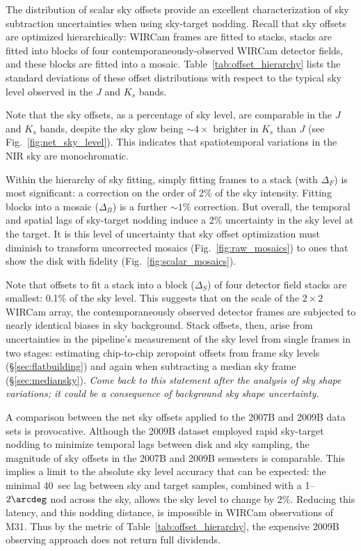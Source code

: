 \documentclass[iop]{emulateapj}
\newcommand{\comment}[1]{\textcolor{OliveGreen}{\textit{#1}}} %
\newcommand{\Fig}[1]{Fig.~\ref{fig:#1}}  %
\newcommand{\Tab}[1]{Table~\ref{tab:#1}}  %
\newcommand{\Sec}[1]{\S\ref{sec:#1}}  %
\begin{document}
The distribution of scalar sky offsets provide an excellent characterization of sky subtraction uncertainties when using sky-target nodding.
Recall that sky offsets are optimized hierarchically: WIRCam frames are fitted to stacks, stacks are fitted into blocks of four contemporaneously-observed WIRCam detector fields, and these blocks are fitted into a mosaic.
\Tab{offset_hierarchy} lists the standard deviations of these offset distributions with respect to the typical sky level observed in the $J$ and $K_s$ bands.


Note that the sky offsets, as a percentage of sky level, are comparable in the $J$ and $K_s$ bands, despite the sky glow being $\sim 4\times$ brighter in $K_s$ than $J$ (see \Fig{net_sky_level}).
This indicates that spatiotemporal variations in the NIR sky are monochromatic.

Within the hierarchy of sky fitting, simply fitting frames to a stack (with $\Delta_F$) is most significant: a correction on the order of 2\% of the sky intensity.
Fitting blocks into a mosaic ($\Delta_B$) is a further $\sim 1$\% correction.
But overall, the temporal and spatial lags of sky-target nodding induce a 2\% uncertainty in the sky level at the target.
It is this level of uncertainty that sky offset optimization must diminish to transform uncorrected mosaics (\Fig{raw_mosaics}) to ones that show the disk with fidelity (\Fig{scalar_mosaics}).

Note that offsets to fit a stack into a block ($\Delta_S$) of four detector field stacks are smallest: 0.1\% of the sky level.
This suggests that on the scale of the $2\times 2$ WIRCam array, the contemporaneously observed detector frames are subjected to nearly identical biases in sky background.
Stack offsets, then, arise from uncertainties in the pipeline's measurement of the sky level from single frames in two stages: estimating chip-to-chip zeropoint offsets from frame sky levels (\Sec{flatbuilding}) and again when subtracting a median sky frame (\Sec{mediansky}).  \comment{Come back to this statement after the analysis of sky shape variations; it could be a consequence of background sky shape uncertainty.}

A comparison between the net sky offsets applied to the 2007B and 2009B data sets is provocative.
Although the 2009B dataset employed rapid sky-target nodding to minimize temporal lags between disk and sky sampling, the magnitude of sky offsets in the 2007B and 2009B semesters is comparable.
This implies a limit to the absolute sky level accuracy that can be expected: the minimal 40~sec lag between sky and target samples, combined with a 1--$2\arcdeg$ nod across the sky, allows the sky level to change by 2\%.
Reducing this latency, and this nodding distance, is impossible in WIRCam observations of M31.
Thus by the metric of \Tab{offset_hierarchy}, the expensive 2009B observing approach does not return full dividends.
\end{document}
